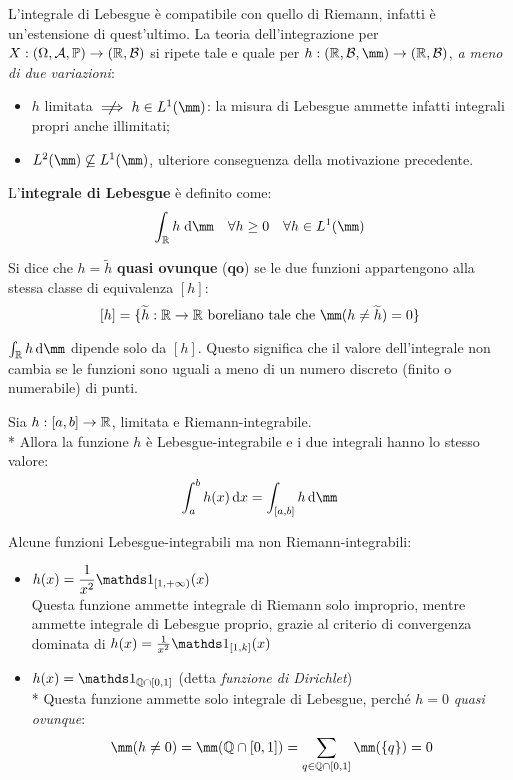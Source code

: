 L'integrale di Lebesgue è compatibile con quello di Riemann, infatti è un'estensione di quest'ultimo.
  La teoria dell'integrazione per $X:(\Omega,\mathcal A,\mathbb P) \to (\mathbb R,\mathcal B)$ si ripete tale e quale per $h:(\RR,\Bc,\mm)\to (\RR,\Bc)$, \textit{a meno di due variazioni}:
\begin{itemize}
  \item $h$ limitata $\centernot\implies h \in L^1(\mm)$: la misura di Lebesgue ammette infatti integrali propri anche illimitati;
  \item $L^2(\mm) \centernot\subseteq L^1(\mm)$, ulteriore conseguenza della motivazione precedente.
  \end{itemize}
\medskip

\begin{defn}
  L'\textbf{integrale di Lebesgue} è definito come:
  $$\int_{\RR} h \; \de\mm \quad \forall h \geq 0 \quad \forall h \in L^1(\mm)$$
\end{defn}
\medskip

\begin{defn}
  Si dice che $h = \widetilde{h}$ \textbf{quasi ovunque} (\textbf{qo}) se le due funzioni appartengono alla stessa classe  di equivalenza $[h]$:
  $$[h] = \{\widetilde{h}: \RR \to \RR \text{ boreliano tale che } \mm(h \neq \widetilde{h}) = 0\}$$
\end{defn}

\begin{nb}
  $\int_{\RR} h \, \de\mm $ dipende solo da $[h]$. Questo significa che il valore dell'integrale non cambia se le funzioni sono uguali a meno di un numero discreto (finito o numerabile) di punti.
\end{nb}

\medskip
\begin{teo}
  Sia $h: [a,b] \to \mathbb R$, limitata e Riemann-integrabile.\\*
  Allora la funzione $h$ è Lebesgue-integrabile e i due integrali hanno lo stesso valore:
  $$\int_a^b h(x) \, \dx = \int_{[a,b]} h \, \de\mm$$
\end{teo}

\medskip
\begin{ese} Alcune funzioni Lebesgue-integrabili ma non Riemann-integrabili:
  \begin{itemize}
    \item $h(x) = \dfrac{1}{x^2} \Ind_{[1, +\infty)}(x)$\\[5pt]
      Questa funzione ammette integrale di Riemann solo improprio, mentre ammette integrale di Lebesgue proprio, grazie al criterio di convergenza dominata di $h(x) = \frac{1}{x^2} \Ind_{[1, k]}(x)$
    \item $h(x) = \Ind_{\QQ \cap [0,1]}$ (detta \textit{funzione di Dirichlet}) \\*
      Questa funzione ammette solo integrale di Lebesgue, perché $h=0$ \textit{quasi ovunque}:
      $$\mm(h\neq 0) = \mm (\QQ \cap [0,1])=\sum_{q \in \QQ \cap [0,1]}\mm(\{q\})=0$$
  \end{itemize}
\end{ese}

